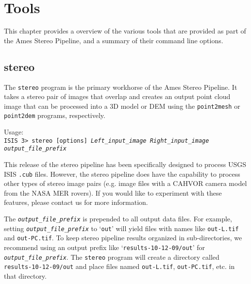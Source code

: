 \chapter{Tools}

This chapter provides a overview of the various tools that are
provided as part of the Ames Stereo Pipeline, and a summary of their
command line options.


\section{stereo}
\label{stereo}

The \texttt{stereo} program is the primary workhorse of the Ames
Stereo Pipeline.  It takes a stereo pair of images that overlap and
creates an output point cloud image that can be processed into a 3D
model or DEM using the \texttt{point2mesh} or \texttt{point2dem}
programs, respectively.

\medskip

Usage:\\
\hspace*{2em}\texttt{ISIS 3> stereo [options] \textit{Left\_input\_image Right\_input\_image output\_file\_prefix}}

\medskip

This release of the stereo pipeline has been specifically designed to
process USGS ISIS \texttt{.cub} files. However, the stereo pipeline
does have the capability to process other types of stereo image pairs
(e.g. image files with a CAHVOR camera model from the NASA MER
rovers).  If you would like to experiment with these features, please
contact us for more information.

The \texttt{\textit{output\_file\_prefix}} is prepended to all
output data files.  For example, setting \texttt{\textit{output\_file\_prefix}}
to `\texttt{out}' will yield files with names like \texttt{out-L.tif}
and \texttt{out-PC.tif}.  To keep stereo pipeline results organized
in sub-directories, we recommend using an output prefix like
`\texttt{results-10-12-09/out}' for \texttt{\textit{output\_file\_prefix}}.  The
\texttt{stereo} program will create a directory called
\texttt{results-10-12-09/out} and place files named \texttt{out-L.tif},
\texttt{out-PC.tif}, etc. in that directory.

